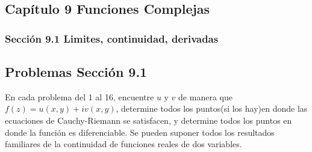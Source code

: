 \documentclass[12pt,letterpaper]{article}
\author{Javier Said Naranjo Miranda}
\begin{document}
\subsection* {Cap\'itulo 9 Funciones Complejas}
	\subsubsection* {Secci\'on 9.1 Limites, continuidad, derivadas}
	\subsection* {Problemas Secci\'on 9.1}
\justify
En cada problema del 1 al 16, encuentre $u$ y $v$ de manera que $f(z) = u(x,y) + iv(x,y)$, determine todos los puntos(si los hay)en donde las ecuaciones de Cauchy-Riemann se satisfacen, y determine todos los puntos en donde la funci\'on es diferenciable. Se pueden suponer todos los resultados familiares de la continuidad de funciones reales de dos variables.
\end{document}
